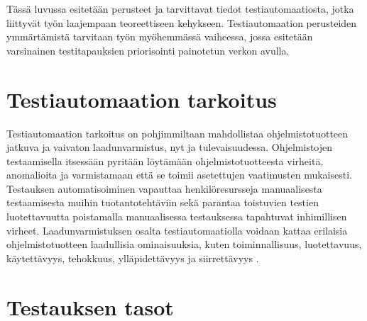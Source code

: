 Tässä luvussa esitetään perusteet ja tarvittavat tiedot testiautomaatiosta, jotka liittyvät työn laajempaan teoreettiseen kehykseen.
Testiautomaation perusteiden ymmärtämistä tarvitaan työn myöhemmässä vaiheessa, jossa esitetään varsinainen testitapauksien priorisointi painotetun verkon avulla.

\section{Testiautomaation tarkoitus}

Testiautomaation tarkoitus on pohjimmiltaan mahdollistaa ohjelmistotuotteen jatkuva ja vaivaton laadunvarmistus, nyt ja tulevaisuudessa.
Ohjelmistojen testaamisella itsessään pyritään löytämään ohjelmistotuotteesta virheitä, anomalioita ja varmistamaan että se toimii asetettujen vaatimusten mukaisesti.
Testauksen automatisoiminen vapauttaa henkilöresursseja manuaalisesta testaamisesta muihin tuotantotehtäviin sekä parantaa toistuvien testien luotettavuutta poistamalla manuaalisessa testauksessa tapahtuvat inhimillisen virheet.
Laadunvarmistuksen osalta testiautomaatiolla voidaan kattaa erilaisia ohjelmistotuotteen laadullisia ominaisuuksia, kuten toiminnallisuus, luotettavuus, käytettävyys, tehokkuus, ylläpidettävyys ja siirrettävyys \parencite{iso_9126-1_2001}.

\section{Testauksen tasot}


